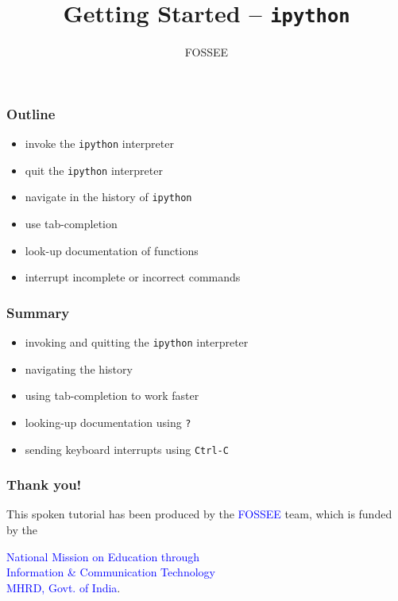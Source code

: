 \documentclass[presentation]{beamer}
\title{Getting Started -- \texttt{ipython}}
\author{FOSSEE}
\date{}
\begin{document}
\maketitle









\begin{frame}
\frametitle{Outline}
\label{sec-1}

\begin{itemize}
\item invoke the \texttt{ipython} interpreter
\item quit the \texttt{ipython} interpreter
\item navigate in the history of \texttt{ipython}
\item use tab-completion
\item look-up documentation of functions
\item interrupt incomplete or incorrect commands
\end{itemize}
\end{frame}
\begin{frame}
\frametitle{Summary}
\label{sec-2}

\begin{itemize}
\item invoking and quitting the \texttt{ipython} interpreter
\item navigating the history
\item using tab-completion to work faster
\item looking-up documentation using \texttt{?}
\item sending keyboard interrupts using \texttt{Ctrl-C}
\end{itemize}
\end{frame}
\begin{frame}
\frametitle{Thank you!}
\label{sec-3}

  \begin{block}{}
  \begin{center}
  This spoken tutorial has been produced by the
  \textcolor{blue}{FOSSEE} team, which is funded by the 
  \end{center}
  \begin{center}
    \textcolor{blue}{National Mission on Education through \\
      Information \& Communication Technology \\ 
      MHRD, Govt. of India}.
  \end{center}  
  \end{block}
\end{frame}
\end{document}
